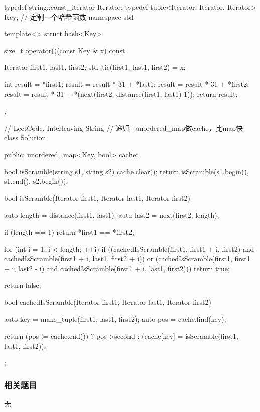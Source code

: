 \begin{Code}
typedef string::const_iterator Iterator;
typedef tuple<Iterator, Iterator, Iterator> Key;
// 定制一个哈希函数
namespace std {
template<> struct hash<Key> {
    size_t operator()(const Key & x) const {
        Iterator first1, last1, first2;
        std::tie(first1, last1, first2) = x;

        int result = *first1;
        result = result * 31 + *last1;
        result = result * 31 + *first2;
        result = result * 31 + *(next(first2, distance(first1, last1)-1));
        return result;
    }
};
}

// LeetCode, Interleaving String
// 递归+unordered_map做cache，比map快
class Solution {
public:
    unordered_map<Key, bool> cache;

    bool isScramble(string s1, string s2) {
        cache.clear();
        return isScramble(s1.begin(), s1.end(), s2.begin());
    }

    bool isScramble(Iterator first1, Iterator last1, Iterator first2) {
        auto length = distance(first1, last1);
        auto last2 = next(first2, length);

        if (length == 1)
            return *first1 == *first2;

        for (int i = 1; i < length; ++i)
            if ((cachedIsScramble(first1, first1 + i, first2)
                    and cachedIsScramble(first1 + i, last1, first2 + i))
                    or (cachedIsScramble(first1, first1 + i, last2 - i)
                            and cachedIsScramble(first1 + i, last1, first2)))
                return true;

        return false;
    }

    bool cachedIsScramble(Iterator first1, Iterator last1, Iterator first2) {
        auto key = make_tuple(first1, last1, first2);
        auto pos = cache.find(key);

        return (pos != cache.end()) ?
                pos->second : (cache[key] = isScramble(first1, last1, first2));
    }
};
\end{Code}

\begin{Code}

\end{Code}


\subsubsection{相关题目}
\begindot
\item 无
\myenddot